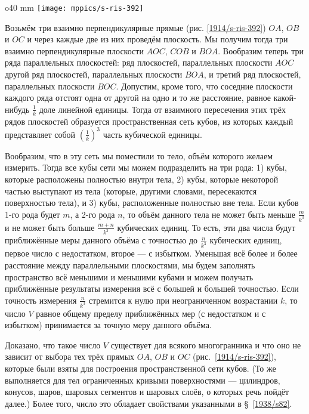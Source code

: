 \begin{wrapfigure}{o}{40 mm}
\vskip-0mm
\centering
\texttt{[image: mppics/s-ris-392]}
\caption{}\label{1914/s-ris-392}
\vskip-0mm
\end{wrapfigure}

Возьмём три взаимно перпендикулярные прямые (рис. \ref{1914/s-ris-392}) $OA$, $OB$ и $OC$ и через каждые две из них проведём плоскость.
Мы получим тогда три взаимно перпендикулярные плоскости $AOC$, $COB$ и $BOA$.
Вообразим теперь три ряда параллельных плоскостей: ряд плоскостей, параллельных плоскости $AOC$ другой ряд плоскостей, параллельных плоскости $BOA$, и третий ряд плоскостей, параллельных плоскости $BOC$.
Допустим, кроме того, что соседние плоскости каждого ряда отстоят одна от другой на одно и то же расстояние, равное какой-нибудь $\tfrac1k$ доле линейной единицы.
Тогда от взаимного пересечения этих трёх рядов плоскостей образуется пространственная сеть кубов, из которых каждый представляет собой $(\tfrac1k)^3$ часть кубической единицы.

Вообразим, что в эту сеть мы поместили то тело, объём которого желаем измерить.
Тогда все кубы сети мы можем подразделить на три рода:
1) кубы, которые расположены полностью внутри тела, 
2) кубы, которые некоторой частью выступают из тела (которые, другими словами, пересекаются поверхностью тела), и  
3) кубы, расположенные полностью вне тела.
Если кубов 1-го рода будет $m$, а 2-го рода $n$, то объём данного тела не может быть меньше $\tfrac{m}{k^3}$ и не может быть больше $\tfrac{m+n}{k^3}$ кубических единиц.
То есть, эти два числа будут приближённые меры данного объёма с точностью до $\tfrac{n}{k^3}$ кубических единиц, первое число с недостатком, второе — с избытком.
Уменьшая всё более и более расстояние между параллельными плоскостями, мы будем заполнять пространство всё меньшими и меньшими кубами и можем получать приближённые результаты измерения всё с большей и большей точностью.
Если точность измерения $\tfrac{n}{k^3}$ стремится к нулю при неограниченном возрастании $k$,
то число $V$ равное общему пределу приближённых мер (с недостатком и с избытком) принимается за точную меру данного объёма. 

Доказано, что такое число $V$ существует для всякого многогранника и что оно не зависит от выбора тех трёх прямых $OA$, $OB$ и $OC$ (рис.~\ref{1914/s-ris-392}), которые были взяты для построения пространственной сети кубов.
(То же выполняется для тел ограниченных кривыми поверхностями — цилиндров, конусов, шаров, шаровых сегментов и шаровых слоёв, о которых речь пойдёт далее.)
Более того, число это обладает свойствами указанными в §~\ref{1938/s82}.

